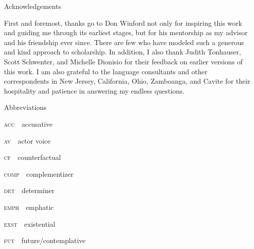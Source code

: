 \begin{stylelsUnNumberedSection}
Acknowledgements
\end{stylelsUnNumberedSection}

\begin{styleStandard}
First and foremost, thanks go to Don Winford not only for inspiring this work and guiding me through its earliest stages, but for his mentorship as my advisor and his friendship ever since. There are few who have modeled such a generous and kind approach to scholarship. In addition, I also thank Judith Tonhauser, Scott Schwenter, and Michelle Dionisio for their feedback on earlier versions of this work. I am also grateful to the language consultants and other correspondents in New Jersey, California, Ohio, Zamboanga, and Cavite for their hospitality and patience in answering my endless questions. 
\end{styleStandard}

\begin{stylelsUnNumberedSection}
Abbreviations
\end{stylelsUnNumberedSection}

\begin{styleStandard}
\textsc{acc\ \ }accusative
\end{styleStandard}

\begin{styleStandard}
\textsc{av\ \ }actor voice
\end{styleStandard}

\begin{styleStandard}
\textsc{cf\ \ }counterfactual
\end{styleStandard}

\begin{styleStandard}
\textsc{comp\ \ }complementizer
\end{styleStandard}

\begin{styleStandard}
\textsc{det\ \ }determiner
\end{styleStandard}

\begin{styleStandard}
\textsc{emph\ \ }emphatic
\end{styleStandard}

\begin{styleStandard}
\textsc{exst\ \ }existential
\end{styleStandard}

\begin{styleStandard}
\textsc{fut\ \ }future/contemplative
\end{styleStandard}

